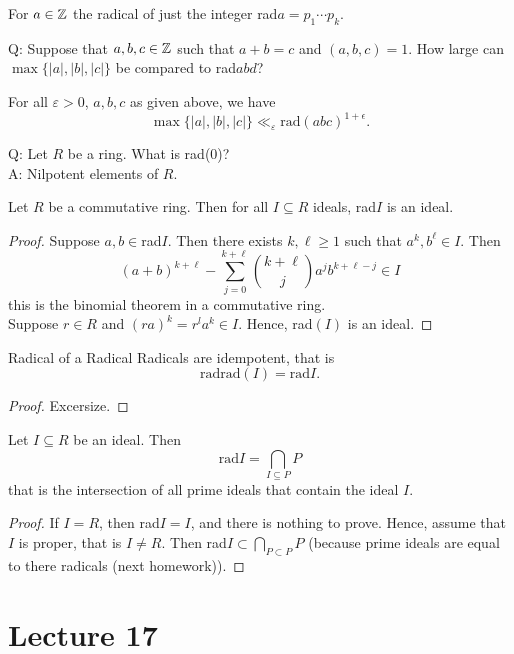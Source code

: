 \documentclass[twoside, openright, fontsize=10pt, headings=big]{scrbook}
\begin{document}
\begin{definition}{}{}
    For $a\in\mathbb{Z}$ the radical of just the integer rad$a=p_1\cdots p_k$.
\end{definition}
Q: Suppose that $a,b,c\in\mathbb{Z}$ such that $a+b=c$ and $(a,b,c)=1$. How large can $\max\{|a|,|b|,|c|\}$ be compared to rad$abd$?
\begin{proposition}{}{}
    For all $\varepsilon>0$, $a,b,c$ as given above, we have
    \[
        \max\{|a|,|b|,|c|\}\ll_\varepsilon\text{rad}(abc)^{1+\epsilon}.
    \]
\end{proposition}
Q: Let $R$ be a ring. What is rad(0)?\\
A: Nilpotent elements of $R$.
\begin{proposition}
    Let $R$ be a commutative ring. Then for all $I\subseteq R$ ideals, rad$I$ is an ideal. 
\end{proposition}
\begin{proof}
    Suppose $a,b\in$rad$I$. Then there exists $k,\ell\geq1$ such that $a^k,b^\ell\in I$. Then 
    \[
        (a+b)^{k+\ell}-\sum_{j=0}^{k+\ell}\binom{k+\ell}{j}a^jb^{k+\ell-j}\in I
    \]
    this is the binomial theorem in a commutative ring.\\
    Suppose $r\in R$ and $(ra)^k=r^la^k\in I$. Hence, rad$(I)$ is an ideal.
\end{proof}
\begin{lemma}{Radical of a Radical}{}
    Radicals are idempotent, that is
    \[
        \text{radrad}(I)=\text{rad}I.
    \]
\end{lemma}
\begin{proof}
    Excersize.
\end{proof}
\begin{proposition}{}{}
    Let $I\subseteq R$ be an ideal. Then 
    \[
        \text{rad}I=\bigcap_{I\subseteq P}P
    \]
    that is the intersection of all prime ideals that contain the ideal $I$.
\end{proposition}
\begin{proof}
    If $I=R$, then rad$I=I$, and there is nothing to prove. Hence, assume that $I$ is proper, that is $I\neq R$. Then rad$I\subset\bigcap_{P\subset P}P$ (because prime ideals are equal to there radicals (next homework)).
\end{proof}

\chapter{Lecture 17}
\end{document}
